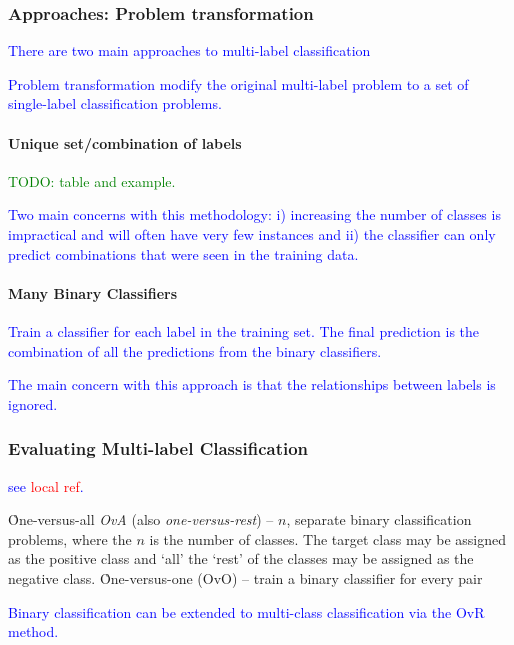 \subsubsection{Approaches: Problem transformation}

\textcolor{blue}{There are two main approaches to multi-label classification}

\textcolor{blue}{{Problem transformation} modify the original multi-label problem to a set of single-label classification problems.}

\paragraph{Unique set/combination of labels}

\textcolor{green}{TODO: table and example.}

\textcolor{blue}{Two main concerns with this methodology: i) increasing the number of classes is impractical and will often have very few instances and ii) the classifier can only predict combinations that were seen in the training data.}

\paragraph{Many Binary Classifiers}

\textcolor{blue}{Train a classifier for each label in the training set. The final prediction is the combination of all the predictions from the binary classifiers.}

\textcolor{blue}{The main concern with this approach is that the relationships between labels is ignored.}

\subsubsection{Evaluating Multi-label Classification}

\textcolor{blue}{see \textcolor{red}{local ref}.}

\r{One-versus-all \emph{OvA} (also \emph{one-versus-rest}) -- $n$, separate binary classification problems, where the $n$ is the number of classes. The target class may be assigned as the positive class and `all' the `rest' of the classes may be assigned as the negative class.
}
\r{One-versus-one (OvO) -- train a binary classifier for every pair}


\textcolor{blue}{Binary classification can be extended to multi-class classification via the OvR method.}

